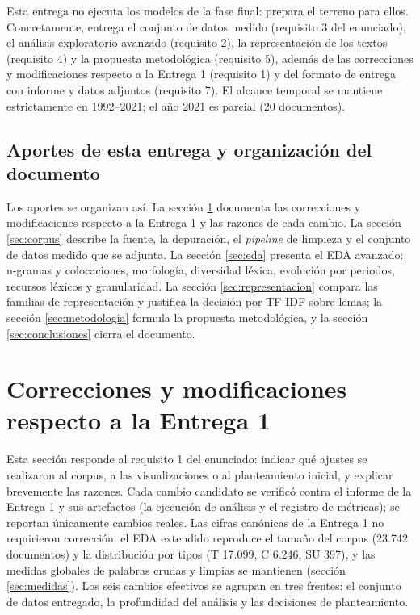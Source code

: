 \documentclass[11pt]{tg_usta}
\begin{document}
Esta entrega no ejecuta los modelos de la fase final: prepara el terreno para ellos. Concretamente, entrega el conjunto de datos medido (requisito 3 del enunciado), el análisis exploratorio avanzado (requisito 2), la representación de los textos (requisito 4) y la propuesta metodológica (requisito 5), además de las correcciones y modificaciones respecto a la Entrega 1 (requisito 1) y del formato de entrega con informe y datos adjuntos (requisito 7). El alcance temporal se mantiene estrictamente en 1992--2021; el año 2021 es parcial (20 documentos).

\subsection{Aportes de esta entrega y organización del documento}
Los aportes se organizan así. La sección \ref{sec:cambios} documenta las correcciones y modificaciones respecto a la Entrega 1 y las razones de cada cambio. La sección \ref{sec:corpus} describe la fuente, la depuración, el \emph{pipeline} de limpieza y el conjunto de datos medido que se adjunta. La sección \ref{sec:eda} presenta el EDA avanzado: n-gramas y colocaciones, morfología, diversidad léxica, evolución por periodos, recursos léxicos y granularidad. La sección \ref{sec:representacion} compara las familias de representación y justifica la decisión por TF-IDF sobre lemas; la sección \ref{sec:metodologia} formula la propuesta metodológica, y la sección \ref{sec:conclusiones} cierra el documento.

\section{Correcciones y modificaciones respecto a la Entrega 1}
\label{sec:cambios}

Esta sección responde al requisito 1 del enunciado: indicar qué ajustes se realizaron al corpus, a las visualizaciones o al planteamiento inicial, y explicar brevemente las razones. Cada cambio candidato se verificó contra el informe de la Entrega 1 y sus artefactos (la ejecución de análisis y el registro de métricas); se reportan únicamente cambios reales. Las cifras canónicas de la Entrega 1 no requirieron corrección: el EDA extendido reproduce el tamaño del corpus (23.742 documentos) y la distribución por tipos (T 17.099, C 6.246, SU 397), y las medidas globales de palabras crudas y limpias se mantienen (sección \ref{sec:medidas}). Los seis cambios efectivos se agrupan en tres frentes: el conjunto de datos entregado, la profundidad del análisis y las decisiones de planteamiento.
\end{document}
